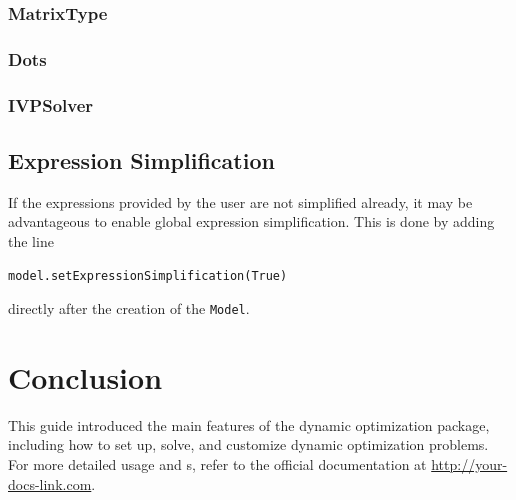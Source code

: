 \documentclass[12pt]{article}
\begin{document}
	\subsubsection{MatrixType}
	\label{c:MatrixType}
	
	\subsubsection{Dots}
	\label{c:Dots}
	
	\subsubsection{IVPSolver}
	\label{c:IVPSolver}
	
	\subsection{Expression Simplification}
	If the expressions provided by the user are not simplified already, it may be advantageous to enable global expression simplification. This is done by adding the line
	\begin{lstlisting}
model.setExpressionSimplification(True)
	\end{lstlisting}
	directly after the creation of the \texttt{Model}.
	 
	
	
	
	\section{Conclusion}
	This guide introduced the main features of the dynamic optimization package, including how to set up, solve, and customize dynamic optimization problems. For more detailed usage and s, refer to the official documentation at \url{http://your-docs-link.com}.
\end{document}
